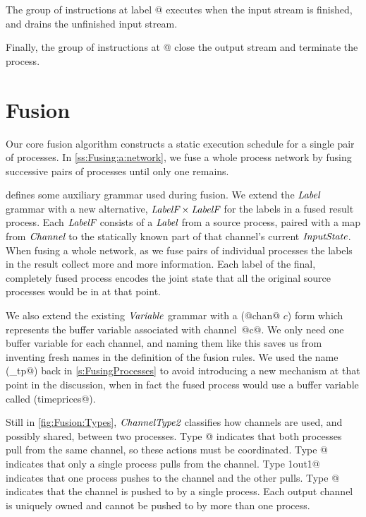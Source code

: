 The group of instructions at label @ executes when the \lstiproc@sA@ input stream is finished, and drains the unfinished \lstiproc@sB@ input stream.

Finally, the group of instructions at @ close the output stream and terminate the process.



\section{Fusion}
\label{s:Fusion}

Our core fusion algorithm constructs a static execution schedule for a single pair of processes.
In \cref{ss:Fusing:a:network}, we fuse a whole process network by fusing successive pairs of processes until only one remains.

 defines some auxiliary grammar used during fusion. We extend the $\textit{Label}$ grammar with a new alternative, $\textit{LabelF} \times \textit{LabelF}$ for the labels in a fused result process. Each $\textit{LabelF}$ consists of a $\textit{Label}$ from a source process, paired with a map from $\textit{Channel}$ to the statically known part of that channel's current $\textit{InputState}$. When fusing a whole network, as we fuse pairs of individual processes the labels in the result collect more and more information. Each label of the final, completely fused process encodes the joint state that all the original source processes would be in at that point.



We also extend the existing $\textit{Variable}$ grammar with a (@chan@ $c$) form which represents the buffer variable associated with \mbox{channel @c@}. We only need one buffer variable for each channel, and naming them like this saves us from inventing fresh names in the definition of the fusion rules.
We used the name (\lstiproc@chan_tp@) back in \cref{s:FusingProcesses} to avoid introducing a new mechanism at that point in the discussion, when in fact the fused process would use a buffer variable called (\lstiproc@chan timeprices@).

Still in \cref{fig:Fusion:Types}, $\textit{ChannelType2}$ classifies how channels are used, and possibly shared, between two processes.
Type @ indicates that both processes pull from the same channel, so these actions must be coordinated.
Type @ indicates that only a single process pulls from the channel.
Type \lstiproc@in1out1@ indicates that one process pushes to the channel and the other pulls.
Type @ indicates that the channel is pushed to by a single process.
Each output channel is uniquely owned and cannot be pushed to by more than one process.

